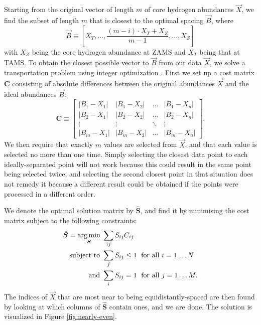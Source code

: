 \documentclass[twocolumn,twocolappendix]{aastex6}
\newcommand\abs[1]{\left|#1\right|}
\begin{document}
Starting from the original vector of length $m$ of core hydrogen abundances $\vec X$, we find the subset of length $m$ that is closest to the optimal spacing $\vec B$, where
\begin{equation}
  \vec B \equiv \left[
    X_T, 
    \ldots, 
    \frac{(m-i)\cdot X_T + X_Z}{m-1}, 
    \ldots, 
    X_Z
  \right]
\end{equation}
with $X_Z$ being the core hydrogen abundance at ZAMS and $X_T$ being that at TAMS. To obtain the closest possible vector to $\vec B$ from our data $\vec X$, we solve a transportation problem using integer optimization \citep{23145595}. First we set up a cost matrix $\boldsymbol{C}$ consisting of absolute differences between the original abundances $\vec X$ and the ideal abundances $\vec B$:
\begin{equation} 
  \boldsymbol{C} \equiv \left[
  \begin{array}{cccc}
    \abs{B_1-X_1} & \abs{B_1-X_2} & \dots & \abs{B_1-X_n} \\
    \abs{B_2-X_1} & \abs{B_2-X_2} & \dots & \abs{B_2-X_n} \\
    \vdots & \vdots & \ddots & \vdots \\
    \abs{B_m-X_1} & \abs{B_m-X_2} & \dots & \abs{B_m-X_n}
  \end{array} \right].
\end{equation}
We then require that exactly $m$ values are selected from $\vec X$, and that each value is selected no more than one time. Simply selecting the closest data point to each ideally-separated point will not work because this could result in the same point being selected twice; and selecting the second closest point in that situation does not remedy it because a different result could be obtained if the points were processed in a different order. 

We denote the optimal solution matrix by $\hat{\boldsymbol{S}}$, and find it by minimising the cost matrix subject to the following constraints:
\begin{align}
  \hat{\boldsymbol{S}} = \underset{\boldsymbol S}{\arg\min} \; & \sum_{ij} S_{ij} C_{ij} \notag\\
  \text{subject to } & \sum_j S_{ij} \leq 1 \; \text{ for all } i=1\ldots N \notag\\
  \text{and } & \sum_i S_{ij} = 1 \; \text{ for all } j=1\ldots M.
  \label{eq:optimal-spacing}
\end{align}
The indices of $\vec X$ that are most near to being equidistantly-spaced are then found by looking at which columns of $\hat{\boldsymbol S}$ contain ones, and we are done. The solution is visualized in Figure \ref{fig:nearly-even}.
\end{document}

